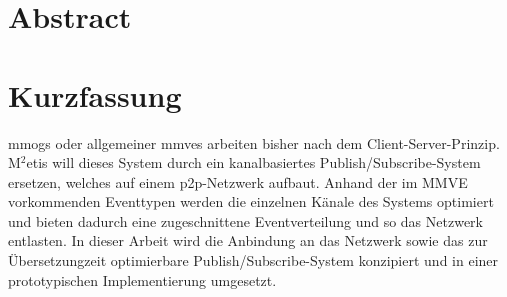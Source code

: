\chapter*{Abstract}



\clearpage{\pagestyle{empty}\cleardoublepage}
\chapter*{Kurzfassung}
\acp{mmog} oder allgemeiner \acp{mmve} arbeiten bisher nach dem Client-Server-Prinzip. M$^2$etis will dieses System durch ein kanalbasiertes Publish/Subscribe-System ersetzen, welches auf einem p2p-Netzwerk aufbaut. Anhand der im MMVE vorkommenden Eventtypen werden die einzelnen Känale des Systems optimiert und bieten dadurch eine zugeschnittene Eventverteilung und so das Netzwerk entlasten. In dieser Arbeit wird die Anbindung an das Netzwerk sowie das zur Übersetzungzeit optimierbare Publish/Subscribe-System konzipiert und in einer prototypischen Implementierung umgesetzt.

